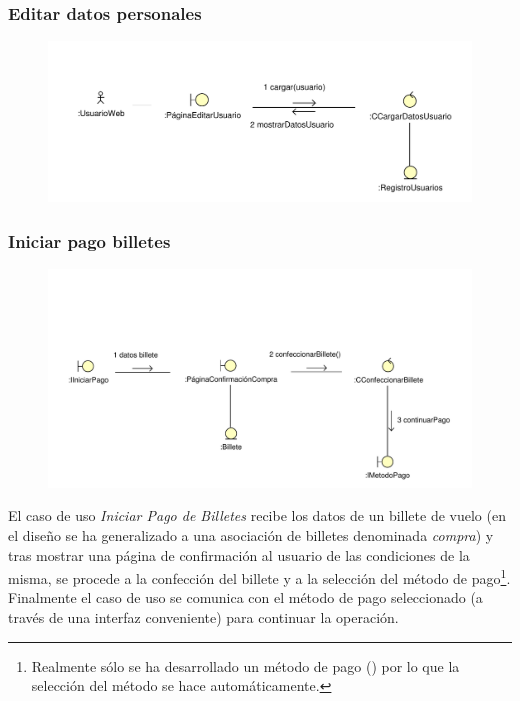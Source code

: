 \documentclass[11pt, a4paper, twoside, titlepage]{article}
\begin{document}
			\subsubsection{Editar datos personales}
				\begin{figure}[H]\centering
					\includegraphics[scale=.86]{diagramas/editardatospersonales.pdf}
				\end{figure}


			\subsubsection{Iniciar pago billetes}
				\begin{figure}[H]\centering
					\includegraphics[scale=.76]{diagramas/iniciarpagobilletes.pdf}
				\end{figure}

					El caso de uso {\itshape Iniciar Pago de Billetes} recibe los datos de un billete de vuelo (en el diseño se ha generalizado a una asociación de billetes denominada {\itshape compra}) y tras mostrar una página de confirmación al usuario de las condiciones de la misma, se procede a la confección del billete y a la selección del método de pago\footnote{Realmente sólo se ha desarrollado un método de pago () por lo que la selección del método se hace automáticamente.}. Finalmente el caso de uso se comunica con el método de pago seleccionado (a través de una interfaz conveniente) para continuar la operación.
\end{document}
